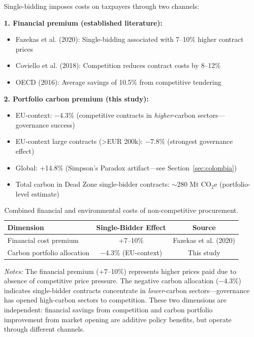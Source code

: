 \documentclass[11pt]{article}
\newcommand{\tabnoteblock}[1]{%
    \par\vspace{0.45em}%
    \begin{minipage}{0.98\linewidth}
    \footnotesize\raggedright #1
    \end{minipage}\par
}
\newcommand{\tabnotes}[1]{\tabnoteblock{\textit{Notes:} #1}}
\begin{document}
Single-bidding imposes costs on taxpayers through two channels:

\textbf{1. Financial premium (established literature):}
\begin{itemize}
\item Fazekas et al. (2020): Single-bidding associated with 7--10\% higher contract prices
\item Coviello et al. (2018): Competition reduces contract costs by 8--12\%
\item OECD (2016): Average savings of 10.5\% from competitive tendering
\end{itemize}

\textbf{2. Portfolio carbon premium (this study):}
\begin{itemize}
\item EU-context: $-$4.3\% (competitive contracts in \textit{higher}-carbon sectors---governance success)
\item EU-context large contracts (>EUR 200k): $-$7.8\% (strongest governance effect)
\item Global: +14.8\% (Simpson's Paradox artifact---see Section~\ref{sec:colombia})
\item Total carbon in Dead Zone single-bidder contracts: $\sim$280 Mt CO$_2$e (portfolio-level estimate)
\end{itemize}

\begin{table}[H]
\centering
\caption{Combined financial and environmental costs of non-competitive procurement.}
\label{tab:doubletax}
\begin{tabular}{lcc}
\toprule
\textbf{Dimension} & \textbf{Single-Bidder Effect} & \textbf{Source} \\
\midrule
Financial cost premium & +7--10\% & Fazekas et al. (2020) \\
Carbon portfolio allocation & $-$4.3\% (EU-context) & This study \\
\bottomrule
\end{tabular}

\tabnotes{The financial premium (+7--10\%) represents higher prices paid due to absence of competitive price pressure. The negative carbon allocation ($-$4.3\%) indicates single-bidder contracts concentrate in \textit{lower}-carbon sectors---governance has opened high-carbon sectors to competition. These two dimensions are independent: financial savings from competition and carbon portfolio improvement from market opening are additive policy benefits, but operate through different channels.
}
\end{table}
\end{document}

